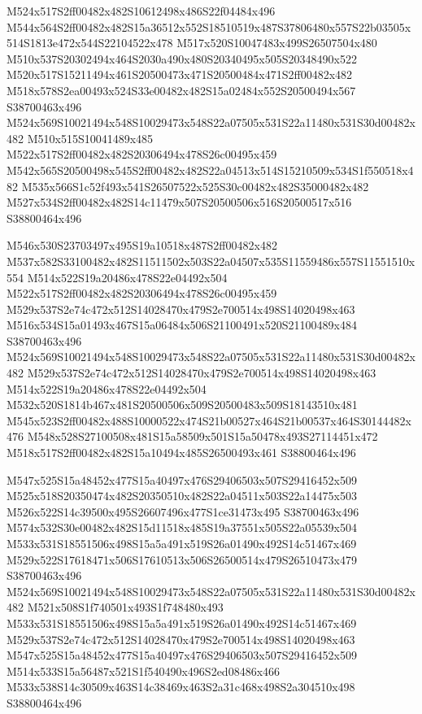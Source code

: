 \documentclass{article}
\begin{document}
\begin{multicols}{2}
M524x517S2ff00482x482S10612498x486S22f04484x496 M544x564S2ff00482x482S15a36512x552S18510519x487S37806480x557S22b03505x514S1813e472x544S22104522x478 M517x520S10047483x499S26507504x480 M510x537S20302494x464S2030a490x480S20340495x505S20348490x522 M520x517S15211494x461S20500473x471S20500484x471S2ff00482x482 M518x578S2ea00493x524S33e00482x482S15a02484x552S20500494x567 S38700463x496 M524x569S10021494x548S10029473x548S22a07505x531S22a11480x531S30d00482x482 M510x515S10041489x485 M522x517S2ff00482x482S20306494x478S26c00495x459 M542x565S20500498x545S2ff00482x482S22a04513x514S15210509x534S1f550518x482 M535x566S1c52f493x541S26507522x525S30c00482x482S35000482x482 M527x534S2ff00482x482S14c11479x507S20500506x516S20500517x516 S38800464x496

M546x530S23703497x495S19a10518x487S2ff00482x482 M537x582S33100482x482S11511502x503S22a04507x535S11559486x557S11551510x554 M514x522S19a20486x478S22e04492x504 M522x517S2ff00482x482S20306494x478S26c00495x459 M529x537S2e74c472x512S14028470x479S2e700514x498S14020498x463 M516x534S15a01493x467S15a06484x506S21100491x520S21100489x484 S38700463x496 M524x569S10021494x548S10029473x548S22a07505x531S22a11480x531S30d00482x482 M529x537S2e74c472x512S14028470x479S2e700514x498S14020498x463 M514x522S19a20486x478S22e04492x504 M532x520S1814b467x481S20500506x509S20500483x509S18143510x481 M545x523S2ff00482x488S10000522x474S21b00527x464S21b00537x464S30144482x476 M548x528S27100508x481S15a58509x501S15a50478x493S27114451x472 M518x517S2ff00482x482S15a10494x485S26500493x461 S38800464x496

M547x525S15a48452x477S15a40497x476S29406503x507S29416452x509 M525x518S20350474x482S20350510x482S22a04511x503S22a14475x503 M526x522S14c39500x495S26607496x477S1ce31473x495 S38700463x496 M574x532S30e00482x482S15d11518x485S19a37551x505S22a05539x504 M533x531S18551506x498S15a5a491x519S26a01490x492S14c51467x469 M529x522S17618471x506S17610513x506S26500514x479S26510473x479 S38700463x496 M524x569S10021494x548S10029473x548S22a07505x531S22a11480x531S30d00482x482 M521x508S1f740501x493S1f748480x493 M533x531S18551506x498S15a5a491x519S26a01490x492S14c51467x469 M529x537S2e74c472x512S14028470x479S2e700514x498S14020498x463 M547x525S15a48452x477S15a40497x476S29406503x507S29416452x509 M514x533S15a56487x521S1f540490x496S2ed08486x466 M533x538S14c30509x463S14c38469x463S2a31c468x498S2a304510x498 S38800464x496


\end{multicols}
\end{document}
